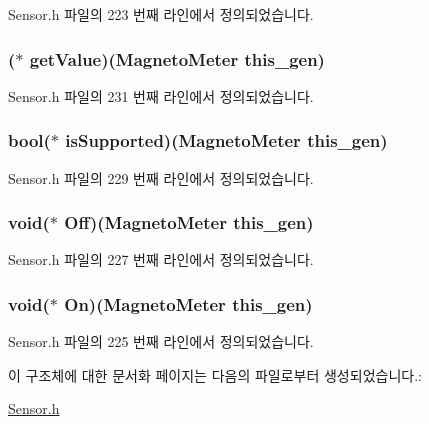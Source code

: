 Sensor.\-h 파일의 223 번째 라인에서 정의되었습니다.

\hypertarget{struct___magneto_meter_a481059371d9d2a273df0fabe18e388a0}{
\subsubsection[{get\-Value}]{($\ast$  get\-Value)({\bf Magneto\-Meter} this\-\_\-gen)}}\label{struct___magneto_meter_a481059371d9d2a273df0fabe18e388a0}


Sensor.\-h 파일의 231 번째 라인에서 정의되었습니다.

\hypertarget{struct___magneto_meter_aac07cae3561bfd9df065be55fb79f145}{
\subsubsection[{is\-Supported}]{\setlength{\rightskip}{0pt plus 5cm}bool($\ast$  is\-Supported)({\bf Magneto\-Meter} this\-\_\-gen)}}\label{struct___magneto_meter_aac07cae3561bfd9df065be55fb79f145}


Sensor.\-h 파일의 229 번째 라인에서 정의되었습니다.

\hypertarget{struct___magneto_meter_ae74e6adbf008d638c954bf852fef4657}{
\subsubsection[{Off}]{\setlength{\rightskip}{0pt plus 5cm}void($\ast$  Off)({\bf Magneto\-Meter} this\-\_\-gen)}}\label{struct___magneto_meter_ae74e6adbf008d638c954bf852fef4657}


Sensor.\-h 파일의 227 번째 라인에서 정의되었습니다.

\hypertarget{struct___magneto_meter_adaae4fb51ff33457e414eb8924c85075}{
\subsubsection[{On}]{\setlength{\rightskip}{0pt plus 5cm}void($\ast$  On)({\bf Magneto\-Meter} this\-\_\-gen)}}\label{struct___magneto_meter_adaae4fb51ff33457e414eb8924c85075}


Sensor.\-h 파일의 225 번째 라인에서 정의되었습니다.



이 구조체에 대한 문서화 페이지는 다음의 파일로부터 생성되었습니다.\-:\begin{DoxyCompactItemize}
\item 
\hyperlink{_sensor_8h}{Sensor.\-h}\end{DoxyCompactItemize}
